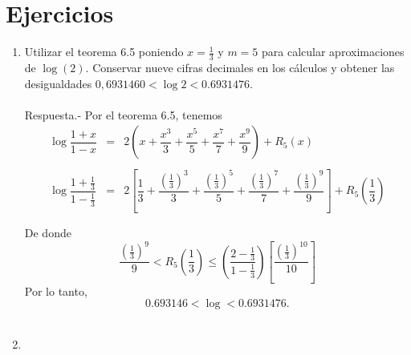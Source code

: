 \section{Ejercicios}
\begin{enumerate}[1.]

    \item Utilizar el teorema 6.5 poniendo $x=\frac{1}{3}$ y $m=5$ para calcular aproximaciones de $\log(2)$. Conservar nueve cifras decimales en los cálculos y obtener las desigualdades $0,6931460<\log 2 < 0.6931476.$\\\\
	Respuesta.-\; Por el teorema 6.5, tenemos
	$$
	\begin{array}{rcl}
	    \log \dfrac{1+x}{1-x} &=& 2\left(x+\dfrac{x^3}{3}+\dfrac{x^5}{5}+\dfrac{x^7}{7}+\dfrac{x^9}{9}\right)+R_5(x)\\\\
	    \log \dfrac{1+\frac{1}{3}}{1-\frac{1}{3}} &=& 2\left[\dfrac{1}{3}+\dfrac{\left(\frac{1}{3}\right)^3}{3}+\dfrac{\left(\frac{1}{3}\right)^5}{5}+\dfrac{\left(\frac{1}{3}\right)^7}{7}+\dfrac{\left(\frac{1}{3}\right)^9}{9}\right]+R_5\left(\dfrac{1}{3}\right)\\\\
	\end{array}
	$$
	De donde
	$$\dfrac{\left(\frac{1}{3}\right)^9}{9}<R_5\left(\dfrac{1}{3}\right)\leq \left(\dfrac{2-\frac{1}{3}}{1-\frac{1}{3}}\right) \left[\dfrac{\left(\frac{1}{3}\right)^{10}}{10}\right]$$
	Por lo tanto,
	$$0.693146<\log < 0.6931476.$$\\

    \item 

\end{enumerate}
